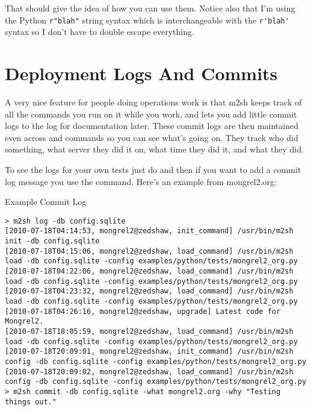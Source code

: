 That should give the idea of how you can use them.  Notice also that I'm using the Python \verb|r"blah"| string syntax which is
interchangeable with the \verb|r'blah'| syntax so I don't have to double escape everything.


\section{Deployment Logs And Commits}

A very nice feature for people doing operations work is that m2sh keeps track of all the
commands you run on it while you work, and lets you add little commit logs to the 
log for documentation later.  These commit logs are then maintained even across 
 and  commands so you can see what's going on.  They 
track who did something, what server they did it on, what time they did it, and what they
did.

To see the logs for your own tests just do  and then
if you want to add a commit log message you use the  command.
Here's an example from mongrel2.org:

\begin{code}{Example Commit Log}
\begin{verbatim}
> m2sh log -db config.sqlite 
[2010-07-18T04:14:53, mongrel2@zedshaw, init_command] /usr/bin/m2sh init -db config.sqlite
[2010-07-18T04:15:06, mongrel2@zedshaw, load_command] /usr/bin/m2sh load -db config.sqlite -config examples/python/tests/mongrel2_org.py
[2010-07-18T04:22:06, mongrel2@zedshaw, load_command] /usr/bin/m2sh load -db config.sqlite -config examples/python/tests/mongrel2_org.py
[2010-07-18T04:23:32, mongrel2@zedshaw, load_command] /usr/bin/m2sh load -db config.sqlite -config examples/python/tests/mongrel2_org.py
[2010-07-18T04:26:16, mongrel2@zedshaw, upgrade] Latest code for Mongrel2.
[2010-07-18T18:05:59, mongrel2@zedshaw, load_command] /usr/bin/m2sh load -db config.sqlite -config examples/python/tests/mongrel2_org.py
[2010-07-18T20:09:01, mongrel2@zedshaw, init_command] /usr/bin/m2sh config -db config.sqlite -config examples/python/tests/mongrel2_org.py
[2010-07-18T20:09:02, mongrel2@zedshaw, load_command] /usr/bin/m2sh config -db config.sqlite -config examples/python/tests/mongrel2_org.py
> m2sh commit -db config.sqlite -what mongrel2.org -why "Testing things out."
\end{verbatim}
\end{code}

